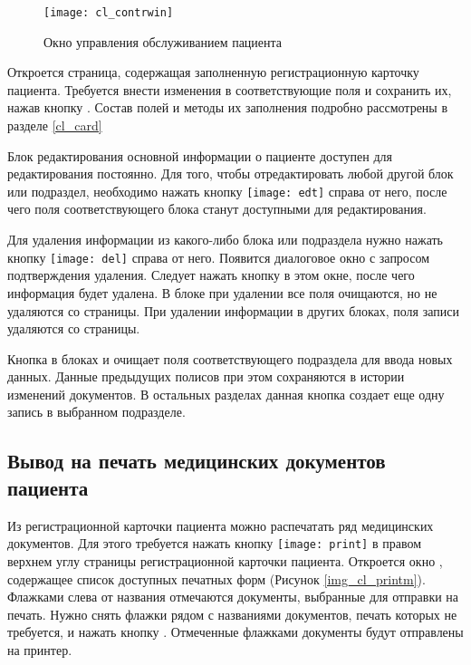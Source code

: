 \begin{figure}[ht]\centering
 \texttt{[image: cl\_contrwin]}
 \caption{Окно управления обслуживанием пациента}
 \label{img_cl_contrwin}
\end{figure} 

Откроется страница, содержащая заполненную регистрационную карточку пациента. Требуется внести изменения в соответствующие поля и сохранить их, нажав кнопку . Состав полей и методы их заполнения подробно рассмотрены в разделе \ref{cl_card}

Блок редактирования основной информации о пациенте доступен для редактирования постоянно. Для того, чтобы отредактировать любой другой блок или подраздел, необходимо нажать кнопку \texttt{[image: edt]} справа от него, после чего поля соответствующего блока станут доступными для редактирования.

Для удаления информации из какого-либо блока или подраздела нужно нажать кнопку \texttt{[image: del]} справа от  него. Появится диалоговое окно с запросом подтверждения удаления. Следует нажать кнопку  в этом окне, после чего информация будет удалена. В блоке  при удалении все поля очищаются, но не удаляются со страницы. При удалении информации в других блоках, поля записи удаляются со страницы.

Кнопка  в блоках  и  очищает поля соответствующего подраздела для ввода новых данных. Данные предыдущих полисов при этом сохраняются в истории изменений документов. В остальных разделах данная кнопка создает еще одну запись в выбранном подразделе.

\subsection{Вывод на печать медицинских документов пациента}

Из регистрационной карточки пациента можно распечатать ряд медицинских документов. Для этого требуется нажать кнопку \texttt{[image: print]} в правом верхнем углу страницы регистрационной карточки пациента. Откроется окно , содержащее список доступных печатных форм (Рисунок \ref{img_cl_printm}). Флажками слева от названия отмечаются документы, выбранные для отправки на печать. Нужно снять флажки рядом с названиями документов, печать которых не требуется, и нажать кнопку . Отмеченные флажками документы будут отправлены на принтер.

